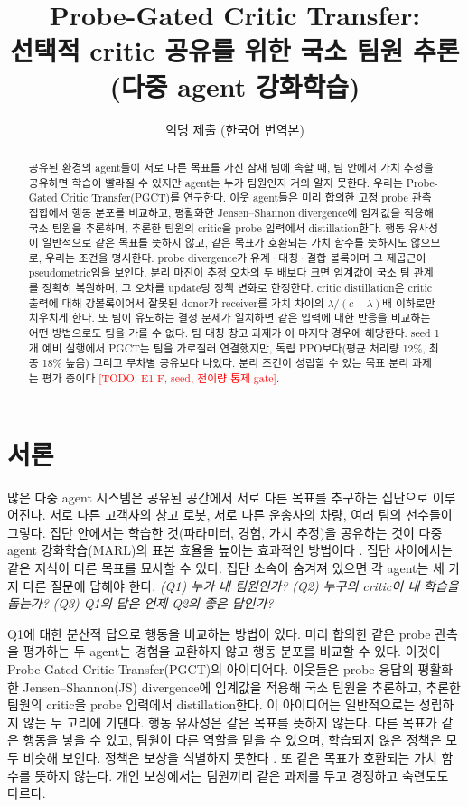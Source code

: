 \documentclass[twocolumn,10pt]{article}
\title{Probe-Gated Critic Transfer:\\ 선택적 critic 공유를 위한 국소 팀원 추론\\ (다중 agent 강화학습)}
\author{익명 제출 (한국어 번역본)}
\date{}
\theoremstyle{remark}
\newcommand{\todo}[1]{\textcolor{red}{[TODO: #1]}}
\newcommand{\ours}{PGCT}
\begin{document}
\maketitle

\begin{abstract}
공유된 환경의 agent들이 서로 다른 목표를 가진 잠재 팀에 속할 때, 팀 안에서 가치 추정을 공유하면 학습이 빨라질 수 있지만 agent는
누가 팀원인지 거의 알지 못한다. 우리는 Probe-Gated Critic Transfer(\ours{})를 연구한다. 이웃 agent들은 미리 합의한 고정 probe 관측 집합에서
행동 분포를 비교하고, 평활화한 Jensen--Shannon divergence에 임계값을 적용해 국소 팀원을 추론하며, 추론한 팀원의 critic을 probe 입력에서
distillation한다. 행동 유사성이 일반적으로 같은 목표를 뜻하지 않고, 같은 목표가 호환되는 가치 함수를 뜻하지도 않으므로, 우리는 조건을 명시한다.
probe divergence가 유계·대칭·결합 볼록이며 그 제곱근이 pseudometric임을 보인다. 분리 마진이 추정 오차의 두 배보다 크면 임계값이 국소 팀 관계를
정확히 복원하며, 그 오차를 update당 정책 변화로 한정한다. critic distillation은 critic 출력에 대해 강볼록이어서 잘못된 donor가 receiver를 가치 차이의
$\lambda/(c+\lambda)$배 이하로만 치우치게 한다. 또 팀이 유도하는 결정 문제가 일치하면 같은 입력에 대한 반응을 비교하는 어떤 방법으로도 팀을 가를 수 없다.
팀 대칭 창고 과제가 이 마지막 경우에 해당한다. seed 1개 예비 실행에서 \ours{}는 팀을 가로질러 연결했지만, 독립 PPO보다(평균 처리량 12\%, 최종 18\% 높음)
그리고 무차별 공유보다 나았다. 분리 조건이 성립할 수 있는 목표 분리 과제는 평가 중이다 \todo{E1-F, seed, 전이량 통제 gate}.
\end{abstract}

\section{서론}
많은 다중 agent 시스템은 공유된 공간에서 서로 다른 목표를 추구하는 집단으로 이루어진다. 서로 다른 고객사의 창고 로봇, 서로 다른 운송사의 차량, 여러 팀의
선수들이 그렇다. 집단 안에서는 학습한 것(파라미터, 경험, 가치 추정)을 공유하는 것이 다중 agent 강화학습(MARL)의 표본 효율을 높이는 효과적인 방법이다
\cite{christianos2020seac,christianos2021seps}. 집단 사이에서는 같은 지식이 다른 목표를 묘사할 수 있다. 집단 소속이 숨겨져 있으면 각 agent는 세 가지 다른
질문에 답해야 한다. \emph{(Q1) 누가 내 팀원인가?} \emph{(Q2) 누구의 critic이 내 학습을 돕는가?} \emph{(Q3) Q1의 답은 언제 Q2의 좋은 답인가?}

Q1에 대한 분산적 답으로 행동을 비교하는 방법이 있다. 미리 합의한 같은 probe 관측을 평가하는 두 agent는 경험을 교환하지 않고 행동 분포를 비교할 수 있다.
이것이 Probe-Gated Critic Transfer(\ours{})의 아이디어다. 이웃들은 probe 응답의 평활화한 Jensen--Shannon(JS) divergence에 임계값을 적용해 국소 팀원을 추론하고,
추론한 팀원의 critic을 probe 입력에서 distillation한다. 이 아이디어는 일반적으로는 성립하지 않는 두 고리에 기댄다. 행동 유사성은 같은 목표를 뜻하지 않는다.
다른 목표가 같은 행동을 낳을 수 있고, 팀원이 다른 역할을 맡을 수 있으며, 학습되지 않은 정책은 모두 비슷해 보인다. 정책은 보상을 식별하지 못한다
\cite{ng2000irl}. 또 같은 목표가 호환되는 가치 함수를 뜻하지 않는다. 개인 보상에서는 팀원끼리 같은 과제를 두고 경쟁하고 숙련도도 다르다.
\end{document}
